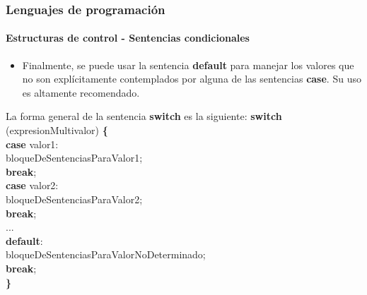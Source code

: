 \documentclass{beamer}
\begin{document}
		\begin{frame}
			\frametitle{Lenguajes de programaci\'on}
			\framesubtitle{Estructuras de control - Sentencias condicionales}

			\begin{itemize}
				\item Finalmente, se puede usar la sentencia \textbf{default} para manejar los valores que no son expl\'icitamente contemplados por alguna de las sentencias \textbf{case}. Su uso es altamente recomendado.
			\end{itemize}

			\begin{block}{La forma general de la sentencia \textbf{switch} es la siguiente:}
			{\scriptsize
				\textbf{switch} (expresionMultivalor) \textbf{\{} \\
				\hspace{0.3cm} \textbf{case} valor1: \\
				\hspace{0.6cm} bloqueDeSentenciasParaValor1; \\
				\hspace{0.6cm} \textbf{break}; \\
				\hspace{0.3cm} \textbf{case} valor2: \\
				\hspace{0.6cm} bloqueDeSentenciasParaValor2; \\
				\hspace{0.6cm} \textbf{break}; \\
				\hspace{0.3cm}...\\
				\hspace{0.3cm} \textbf{default}: \\
				\hspace{0.6cm} bloqueDeSentenciasParaValorNoDeterminado; \\
				\hspace{0.6cm} \textbf{break}; \\
				\textbf{\}}
			}
			\end{block}
		\end{frame}
\end{document}
